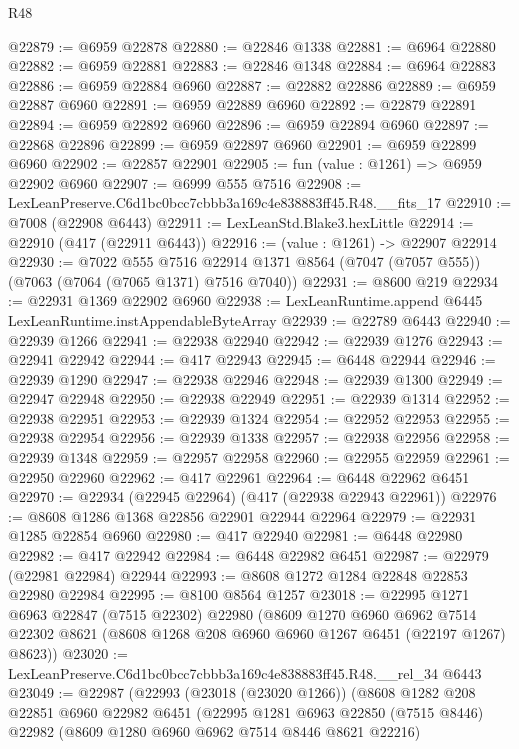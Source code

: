 \begin{lexlean}{R48}
\begin{coremodule}
@22879 := @6959 @22878
@22880 := @22846 @1338
@22881 := @6964 @22880
@22882 := @6959 @22881
@22883 := @22846 @1348
@22884 := @6964 @22883
@22886 := @6959 @22884 @6960
@22887 := @22882 @22886
@22889 := @6959 @22887 @6960
@22891 := @6959 @22889 @6960
@22892 := @22879 @22891
@22894 := @6959 @22892 @6960
@22896 := @6959 @22894 @6960
@22897 := @22868 @22896
@22899 := @6959 @22897 @6960
@22901 := @6959 @22899 @6960
@22902 := @22857 @22901
@22905 := fun (value : @1261) => @6959 @22902 @6960
@22907 := @6999 @555 @7516
@22908 := LexLeanPreserve.C6d1bc0bcc7cbbb3a169c4e838883ff45.R48.__fits_17
@22910 := @7008 (@22908 @6443)
@22911 := LexLeanStd.Blake3.hexLittle
@22914 := @22910 (@417 (@22911 @6443))
@22916 := (value : @1261) -> @22907 @22914
@22930 := @7022
    @555
    @7516
    @22914
    @1371
    @8564
    (@7047 (@7057 @555))
    (@7063 (@7064 (@7065 @1371) @7516 @7040))
@22931 := @8600 @219
@22934 := @22931 @1369 @22902 @6960
@22938 := LexLeanRuntime.append @6445 LexLeanRuntime.instAppendableByteArray
@22939 := @22789 @6443
@22940 := @22939 @1266
@22941 := @22938 @22940
@22942 := @22939 @1276
@22943 := @22941 @22942
@22944 := @417 @22943
@22945 := @6448 @22944
@22946 := @22939 @1290
@22947 := @22938 @22946
@22948 := @22939 @1300
@22949 := @22947 @22948
@22950 := @22938 @22949
@22951 := @22939 @1314
@22952 := @22938 @22951
@22953 := @22939 @1324
@22954 := @22952 @22953
@22955 := @22938 @22954
@22956 := @22939 @1338
@22957 := @22938 @22956
@22958 := @22939 @1348
@22959 := @22957 @22958
@22960 := @22955 @22959
@22961 := @22950 @22960
@22962 := @417 @22961
@22964 := @6448 @22962 @6451
@22970 := @22934 (@22945 @22964) (@417 (@22938 @22943 @22961))
@22976 := @8608 @1286 @1368 @22856 @22901 @22944 @22964
@22979 := @22931 @1285 @22854 @6960
@22980 := @417 @22940
@22981 := @6448 @22980
@22982 := @417 @22942
@22984 := @6448 @22982 @6451
@22987 := @22979 (@22981 @22984) @22944
@22993 := @8608 @1272 @1284 @22848 @22853 @22980 @22984
@22995 := @8100 @8564 @1257
@23018 := @22995
    @1271
    @6963
    @22847
    (@7515 @22302)
    @22980
    (@8609
      @1270
      @6960
      @6962
      @7514
      @22302
      @8621
      (@8608 @1268 @208 @6960 @6960 @1267 @6451 (@22197 @1267) @8623))
@23020 := LexLeanPreserve.C6d1bc0bcc7cbbb3a169c4e838883ff45.R48.__rel_34 @6443
@23049 := @22987
    (@22993
      (@23018 (@23020 @1266))
      (@8608
        @1282
        @208
        @22851
        @6960
        @22982
        @6451
        (@22995
          @1281
          @6963
          @22850
          (@7515 @8446)
          @22982
          (@8609 @1280 @6960 @6962 @7514 @8446 @8621 @22216)

\end{coremodule}
\end{lexlean}
